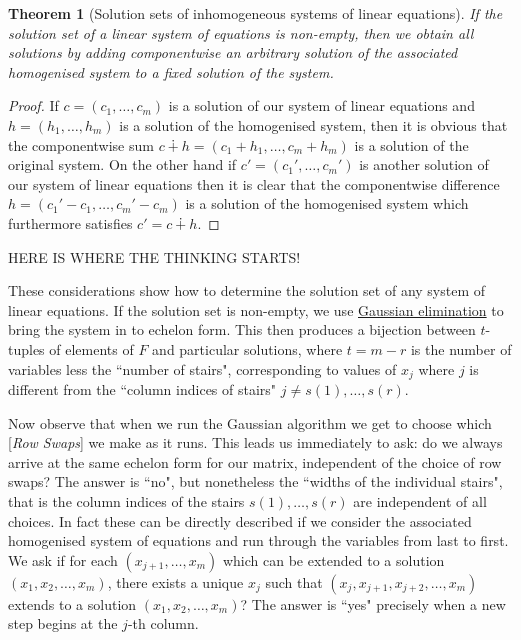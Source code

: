 \documentclass[11pt]{amsbook}
\newtheorem{theorem}{Theorem}[section]
\theoremstyle{definition}
\begin{document}
\begin{theorem}[Solution sets of inhomogeneous systems of linear equations] If the solution set of a linear system of equations is non-empty, then we obtain all solutions by adding componentwise an arbitrary solution of the associated homogenised system to a fixed solution of the system.
\end{theorem}
\begin{proof}If $c = (c_1, \ldots , c_m)$ is a solution of our system of linear equations and $h = (h_1, \ldots , h_m)$ is a solution of the homogenised system, then it is obvious that the componentwise sum $c \dotplus h = (c_1+ h_1, \ldots , c_m+h_m)$ is a solution of the original system. On the other hand if $c' = (c_1', \ldots , c_m')$ is another solution of our system of linear equations then it is clear that the componentwise difference $h = (c_1' - c_1, \ldots , c_m'-c_m)$ is a solution of the homogenised system which furthermore satisfies $c' = c \dotplus h$.
\end{proof}

\noindent
HERE IS WHERE THE THINKING STARTS!
\medskip
\label{theshotthatshooktheworld}

These considerations show how to determine the solution set of any system of linear equations. If the solution set is non-empty, we use \hyperref[gaussalg]{Gaussian elimination} to bring the system in to echelon form. This then produces a bijection between $t$-tuples of elements of $F$ and particular solutions, where $t = m -r$ is the number of variables less the ``number of stairs", corresponding to values of $x_j$ where $j$ is different from the ``column indices of stairs" $j\neq s(1), \ldots , s(r)$.
\medskip

Now observe that when we run the Gaussian algorithm we get to choose which [{\it Row Swaps}] we make as it runs. This leads us immediately to ask: do we always arrive at the same echelon form for our matrix, independent of the choice of row swaps? The answer is ``no", but nonetheless the ``widths of the individual stairs", that is the column indices of the stairs $s(1), \ldots , s(r)$ are independent of all choices. In fact these can be directly described if we consider the associated homogenised system of equations and run through the variables from last to first. We ask if for each $(x_{j+1}, \ldots , x_m)$ which can be extended to a solution $(x_1, x_2, \ldots , x_m)$, there exists a unique $x_j$ such that $(x_j, x_{j+1}, x_{j+2}, \ldots , x_m)$ extends to a solution $(x_1, x_2, \ldots , x_m)$? The answer is ``yes" precisely when a new step begins at the $j$-th column.
\end{document}
